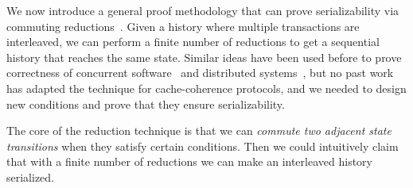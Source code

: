 \documentclass[sigplan,10pt,review,anonymous,screen]{acmart}\settopmatter{printfolios=true,printccs=false,printacmref=false}
\begin{document}
We now introduce a general proof methodology that can prove serializability via commuting reductions~\cite{reduction}.
Given a history where multiple transactions are interleaved, we can perform a finite number of reductions to get a sequential history that reaches the same state.
Similar ideas have been used before to prove correctness of concurrent software~\cite{Chajed:2018} and distributed systems~\cite{Hawblitzel:2015,Hawblitzel:2017}, but no past work has adapted the technique for cache-coherence protocols, and we needed to design new conditions and prove that they ensure serializability.

The core of the reduction technique is that we can \emph{commute two adjacent state transitions} when they satisfy certain conditions.
Then we could intuitively claim that with a finite number of reductions we can make an interleaved history serialized.
\end{document}
